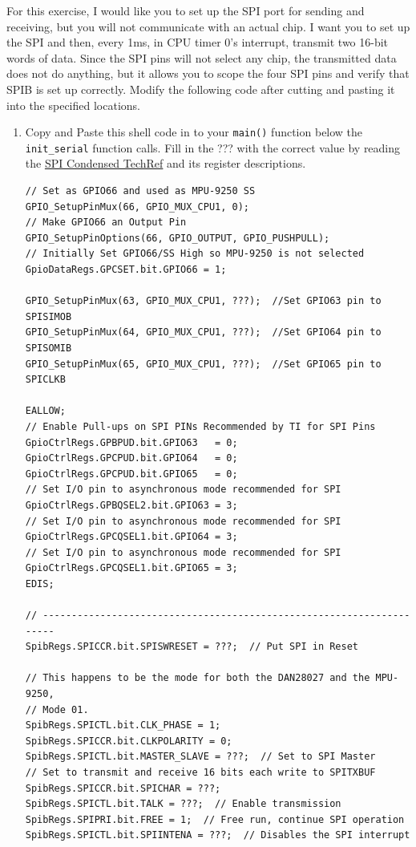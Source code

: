 \documentclass[11pt]{article}
\begin{document}
For this exercise, I would like you to set up the SPI port for sending and receiving, but you will not communicate with an actual chip. I want you to set up the SPI and then, every 1ms, in CPU timer 0’s interrupt, transmit two 16-bit words of data. Since the SPI pins will not select any chip, the transmitted data does not do anything, but it allows you to scope the four SPI pins and verify that SPIB is set up correctly. Modify the following code after cutting and pasting it into the specified locations.
%
\begin{enumerate}
        \item Copy and Paste this shell code in to your \texttt{main()} function below the \texttt{init_serial} function calls. Fill in the ??? with the correct value by reading the \href{http://coecsl.ece.illinois.edu/se423/SPICondensed_TechRef.pdf}{SPI Condensed TechRef} and its register descriptions.
\begin{verbatim}
// Set as GPIO66 and used as MPU-9250 SS
GPIO_SetupPinMux(66, GPIO_MUX_CPU1, 0);
// Make GPIO66 an Output Pin
GPIO_SetupPinOptions(66, GPIO_OUTPUT, GPIO_PUSHPULL);
// Initially Set GPIO66/SS High so MPU-9250 is not selected
GpioDataRegs.GPCSET.bit.GPIO66 = 1;

GPIO_SetupPinMux(63, GPIO_MUX_CPU1, ???);  //Set GPIO63 pin to SPISIMOB
GPIO_SetupPinMux(64, GPIO_MUX_CPU1, ???);  //Set GPIO64 pin to SPISOMIB
GPIO_SetupPinMux(65, GPIO_MUX_CPU1, ???);  //Set GPIO65 pin to SPICLKB

EALLOW;
// Enable Pull-ups on SPI PINs Recommended by TI for SPI Pins
GpioCtrlRegs.GPBPUD.bit.GPIO63   = 0;
GpioCtrlRegs.GPCPUD.bit.GPIO64   = 0;
GpioCtrlRegs.GPCPUD.bit.GPIO65   = 0;
// Set I/O pin to asynchronous mode recommended for SPI
GpioCtrlRegs.GPBQSEL2.bit.GPIO63 = 3;
// Set I/O pin to asynchronous mode recommended for SPI
GpioCtrlRegs.GPCQSEL1.bit.GPIO64 = 3;
// Set I/O pin to asynchronous mode recommended for SPI
GpioCtrlRegs.GPCQSEL1.bit.GPIO65 = 3;
EDIS;

// ---------------------------------------------------------------------
SpibRegs.SPICCR.bit.SPISWRESET = ???;  // Put SPI in Reset

// This happens to be the mode for both the DAN28027 and the MPU-9250,
// Mode 01.
SpibRegs.SPICTL.bit.CLK_PHASE = 1;
SpibRegs.SPICCR.bit.CLKPOLARITY = 0;
SpibRegs.SPICTL.bit.MASTER_SLAVE = ???;  // Set to SPI Master
// Set to transmit and receive 16 bits each write to SPITXBUF
SpibRegs.SPICCR.bit.SPICHAR = ???;
SpibRegs.SPICTL.bit.TALK = ???;  // Enable transmission
SpibRegs.SPIPRI.bit.FREE = 1;  // Free run, continue SPI operation
SpibRegs.SPICTL.bit.SPIINTENA = ???;  // Disables the SPI interrupt


\end{verbatim}
\end{enumerate}
\end{document}
